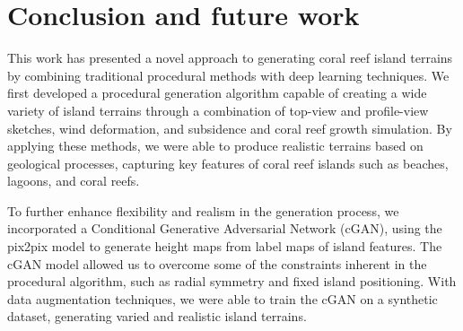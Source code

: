 \documentclass{egpubl}
\begin{document}


\section{Conclusion and future work}

This work has presented a novel approach to generating coral reef island terrains by combining traditional procedural methods with deep learning techniques. We first developed a procedural generation algorithm capable of creating a wide variety of island terrains through a combination of top-view and profile-view sketches, wind deformation, and subsidence and coral reef growth simulation. By applying these methods, we were able to produce realistic terrains based on geological processes, capturing key features of coral reef islands such as beaches, lagoons, and coral reefs.

To further enhance flexibility and realism in the generation process, we incorporated a Conditional Generative Adversarial Network (cGAN), using the pix2pix model to generate height maps from label maps of island features. The cGAN model allowed us to overcome some of the constraints inherent in the procedural algorithm, such as radial symmetry and fixed island positioning. With data augmentation techniques, we were able to train the cGAN on a synthetic dataset, generating varied and realistic island terrains.



\end{document}
